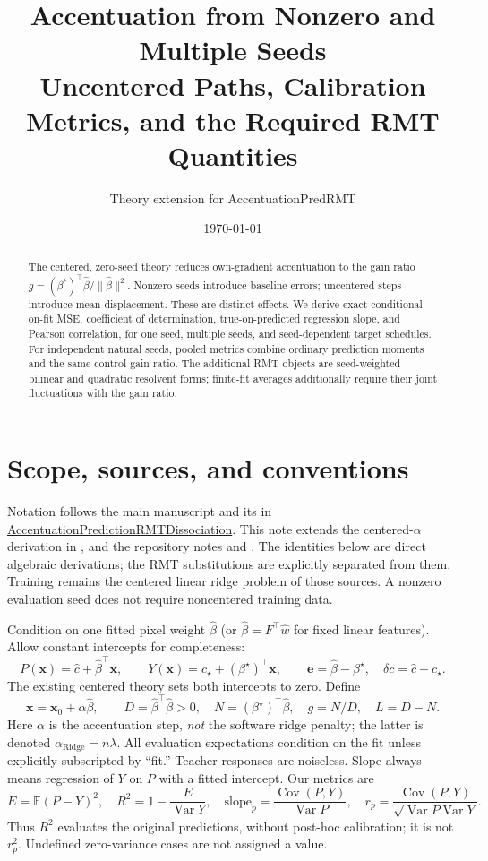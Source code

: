 \documentclass[11pt]{article}
\title{Accentuation from Nonzero and Multiple Seeds\\Uncentered Paths, Calibration Metrics, and the Required RMT Quantities}
\author{Theory extension for AccentuationPredRMT}
\date{\today}
\newcommand{\E}{\mathbb E}
\newcommand{\Var}{\operatorname{Var}}
\newcommand{\Cov}{\operatorname{Cov}}
\newcommand{\bstar}{{\beta^{\star}}}
\newcommand{\bhat}{\hat{\beta}}
\newcommand{\x}{\mathbf{x}}
\begin{document}
\maketitle
\begin{abstract}
The centered, zero-seed theory reduces own-gradient accentuation to the gain
ratio $g=(\bstar)^\top\bhat/\|\bhat\|^2$. Nonzero seeds introduce baseline errors;
uncentered steps introduce mean displacement. These are distinct effects.
We derive exact conditional-on-fit MSE, coefficient of determination,
true-on-predicted regression slope, and Pearson correlation, for one seed,
multiple seeds, and seed-dependent target schedules. For independent natural
seeds, pooled metrics combine ordinary prediction moments and the same
control gain ratio. The additional RMT objects are seed-weighted bilinear
and quadratic resolvent forms; finite-fit averages additionally require their
joint fluctuations with the gain ratio.
\end{abstract}

\section{Scope, sources, and conventions}
\begingroup\sloppy
Notation follows the main manuscript
 and its 
in \href{https://github.com/Animadversio/AccentuationPredictionRMTDissociation}{AccentuationPredictionRMTDissociation}.
This note extends the centered-$\alpha$ derivation in
,
and the repository notes
 and
.
The identities below are direct algebraic derivations; the RMT substitutions
are explicitly separated from them. Training remains the centered linear
ridge problem of those sources. A nonzero evaluation seed does not require
noncentered training data.
\par\endgroup

Condition on one fitted pixel weight $\bhat$ (or
$\bhat=F^\top\hat w$ for fixed linear features). Allow constant
intercepts for completeness:
\[
 P(\x)=\widehat c+\bhat^\top\x,\qquad
 Y(\x)=c_\star+(\bstar)^\top\x,\qquad
 \bm e=\bhat-\bstar,\quad \delta c=\widehat c-c_\star.
\]
The existing centered theory sets both intercepts to zero. Define
\[
 \x=\x_0+\alpha\bhat,\qquad
 D=\bhat^\top\bhat>0,\quad N=(\bstar)^\top\bhat,\quad g=N/D,\quad L=D-N.
\]
Here $\alpha$ is the accentuation step, \emph{not} the software ridge penalty;
the latter is denoted $\alpha_{\mathrm{Ridge}}=n\lambda$. All evaluation expectations condition on
the fit unless explicitly subscripted by ``fit.'' Teacher responses are
noiseless. Slope always means regression of $Y$ on $P$ with a fitted intercept.
Our metrics are
\begin{equation}\label{eq:metrics}
 E=\E(P-Y)^2,\quad R^2=1-\frac{E}{\Var Y},\quad
 \mathrm{slope}_p=\frac{\Cov(P,Y)}{\Var P},\quad
 r_p=\frac{\Cov(P,Y)}{\sqrt{\Var P\Var Y}}.
\end{equation}
Thus $R^2$ evaluates the original predictions, without post-hoc calibration;
it is not $r_p^2$. Undefined zero-variance cases are not assigned a value.
\end{document}
